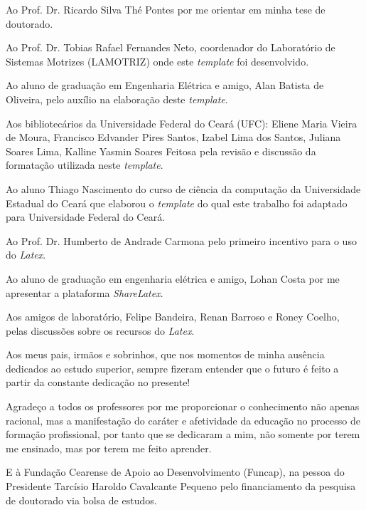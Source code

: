 Ao Prof. Dr. Ricardo Silva Thé Pontes por me orientar em minha tese de doutorado.

Ao Prof. Dr. Tobias Rafael Fernandes Neto, coordenador do Laboratório de Sistemas Motrizes (LAMOTRIZ) onde este \textit{template} foi desenvolvido. 

Ao aluno de graduação em Engenharia Elétrica e amigo, Alan Batista de Oliveira, pelo auxílio na elaboração deste \textit{template}. 

Aos bibliotecários da Universidade Federal do Ceará (UFC): Eliene Maria Vieira de Moura, Francisco Edvander Pires Santos, Izabel Lima dos Santos, Juliana Soares Lima, Kalline Yasmin Soares Feitosa pela revisão e discussão da formatação utilizada neste \textit{template}.

Ao aluno Thiago Nascimento do curso de ciência da computação da Universidade Estadual do Ceará que elaborou o \textit{template} do qual este trabalho foi adaptado para Universidade Federal do Ceará.

Ao Prof. Dr. Humberto de Andrade Carmona pelo primeiro incentivo para o uso do \textit{Latex}.

Ao aluno de graduação em engenharia elétrica e amigo, Lohan Costa por me apresentar a plataforma \textit{ShareLatex}. 

Aos amigos de laboratório, Felipe Bandeira, Renan Barroso e Roney Coelho, pelas discussões sobre os recursos do \textit{Latex}.

Aos meus pais, irmãos e sobrinhos, que nos momentos de minha ausência dedicados ao estudo superior, sempre fizeram entender que o futuro é feito a partir da constante dedicação no presente!

Agradeço a todos os professores por me proporcionar o conhecimento não apenas racional, mas a manifestação do caráter e afetividade da educação no processo de formação profissional, por tanto que se dedicaram a mim, não somente por terem me ensinado, mas por terem me feito aprender. 

E à Fundação Cearense de Apoio ao Desenvolvimento (Funcap), na pessoa do Presidente Tarcísio Haroldo Cavalcante Pequeno pelo financiamento da pesquisa de doutorado via bolsa de estudos.
